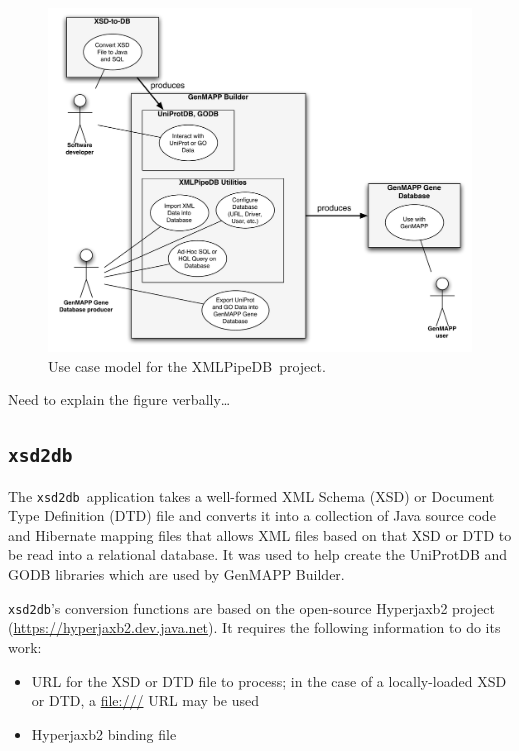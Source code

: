 \documentclass[10pt]{bmc_article}
\newenvironment{bmcformat}{\begin{raggedright}\baselineskip20pt\sloppy\setboolean{publ}{false}}{\end{raggedright}\baselineskip20pt\sloppy}
\def\xmlpipedb{XMLPipeDB}                       %
\def\xsd2db{\texttt{xsd2db}}
\begin{document}
\begin{bmcformat}
\begin{figure}[htbp] %
   \centering
   \includegraphics[width=5.5in]{figures/use-cases.pdf} 
   \caption{Use case model for the \xmlpipedb\ project.}
   \label{usecase}
\end{figure}

Need to explain the figure verbally\ldots\pb

\subsection*{\xsd2db}

The \xsd2db\ application takes a well-formed XML Schema (XSD) or Document Type Definition (DTD) file and converts it into a collection of Java source code and Hibernate mapping files that allows XML files based on that XSD or DTD to be read into a relational database.  It was used to help create the UniProtDB and GODB libraries which are used by GenMAPP Builder.\pb

\xsd2db's conversion functions are based on the open-source Hyperjaxb2 project (\url{https://hyperjaxb2.dev.java.net}).  It requires the following information to do its work:
\begin{itemize}
\item URL for the XSD or DTD file to process; in the case of a locally-loaded XSD or DTD, a \url{file:///} URL may be used

\item Hyperjaxb2 binding file


\end{itemize}
\end{bmcformat}
\end{document}
